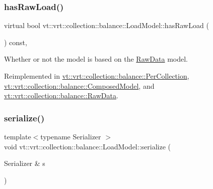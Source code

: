 \mbox{\label{structvt_1_1vrt_1_1collection_1_1balance_1_1_load_model_a626f65c651ea15f4a40b9f058778c620}} 
\subsubsection{\texorpdfstring{has\+Raw\+Load()}{hasRawLoad()}}
{\footnotesize\ttfamily virtual bool vt\+::vrt\+::collection\+::balance\+::\+Load\+Model\+::has\+Raw\+Load (\begin{DoxyParamCaption}{ }\end{DoxyParamCaption}) const\hspace{0.3cm}{\ttfamily [inline]}, {\ttfamily [virtual]}}



Whether or not the model is based on the \hyperlink{structvt_1_1vrt_1_1collection_1_1balance_1_1_raw_data}{Raw\+Data} model. 



Reimplemented in \hyperlink{structvt_1_1vrt_1_1collection_1_1balance_1_1_per_collection_a82a94bbf8764a3c6bd346e4a686e1efb}{vt\+::vrt\+::collection\+::balance\+::\+Per\+Collection}, \hyperlink{classvt_1_1vrt_1_1collection_1_1balance_1_1_composed_model_ad6e2a1c572a80e35acad0fcf1a0e8071}{vt\+::vrt\+::collection\+::balance\+::\+Composed\+Model}, and \hyperlink{structvt_1_1vrt_1_1collection_1_1balance_1_1_raw_data_a81391396ba96f5bc7578ac6d07d968ce}{vt\+::vrt\+::collection\+::balance\+::\+Raw\+Data}.

\mbox{\label{structvt_1_1vrt_1_1collection_1_1balance_1_1_load_model_a52e2210225947697a235b75c385eb104}} 
\subsubsection{\texorpdfstring{serialize()}{serialize()}}
{\footnotesize\ttfamily template$<$typename Serializer $>$ \\
void vt\+::vrt\+::collection\+::balance\+::\+Load\+Model\+::serialize (\begin{DoxyParamCaption}\item[{Serializer \&}]{s }\end{DoxyParamCaption})\hspace{0.3cm}{\ttfamily [inline]}}

